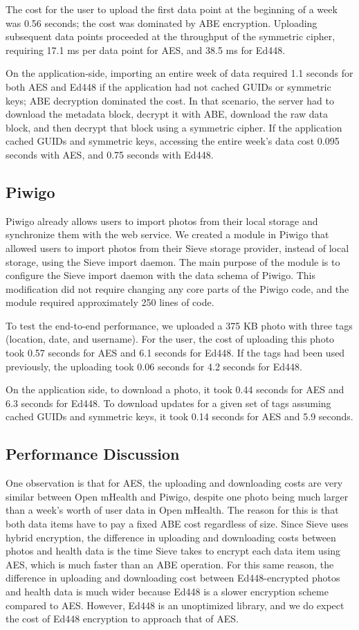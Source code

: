 The cost for the user to upload the first data point
at the beginning of a week was 0.56 seconds;
the cost was dominated by ABE encryption.
Uploading subsequent data points proceeded
at the throughput of the symmetric cipher,
requiring 17.1 ms per data point for AES,
and 38.5 ms for Ed448.

On the application-side, importing an entire
week of data required 1.1 seconds for both AES 
and Ed448 if the application had not cached GUIDs or symmetric
keys; ABE decryption dominated the cost. 
In that scenario, the server had to
download the metadata block, decrypt it with
ABE, download the raw data block, and then
decrypt that block using a symmetric cipher. 
If the application cached GUIDs and symmetric keys,
accessing the entire week's data cost 0.095 seconds
with AES, and 0.75 seconds with Ed448.

\subsection{Piwigo}
Piwigo already allows users
to import photos from their local storage and synchronize
them with the web service. We created a module in
Piwigo that allowed users to import photos from
their Sieve storage provider, instead of local storage,
using the Sieve import daemon. The main purpose of the
module is to configure the Sieve import daemon
with the data schema of Piwigo. This modification
did not require changing any core parts of the Piwigo
code, and the module required approximately 250 lines 
of code.

To test the end-to-end performance, we uploaded a 375 KB photo with three
tags (location, date, and username). For the user, the cost of uploading 
this photo took 0.57 seconds for AES and 6.1 seconds for Ed448.
If the tags had been used previously, the uploading
took 0.06 seconds for 4.2 seconds for Ed448.

On the application side, to download a photo, 
it took 0.44 seconds for AES and 
6.3 seconds for Ed448. To download updates for a given
set of tags assuming cached GUIDs and symmetric keys,
it took 0.14 seconds for AES and 5.9 seconds.

\subsection{Performance Discussion}
One observation is that for AES, the uploading and downloading 
costs are very similar between
Open mHealth and Piwigo, despite one photo being
much larger than a week's worth of user data in Open mHealth.
The reason for this is that both data items have to pay a fixed
ABE cost regardless of size. Since Sieve uses hybrid encryption,
the difference in uploading and downloading 
costs between photos and health data
is the time Sieve takes to
encrypt each data item using AES, which is much faster than an ABE operation.
For this same reason, the difference in
uploading and downloading cost between Ed448-encrypted photos and health data
is much wider because Ed448 is a slower encryption scheme compared to AES. 
However, Ed448 is an unoptimized library, and we do expect the cost of
Ed448 encryption to approach that of AES.

